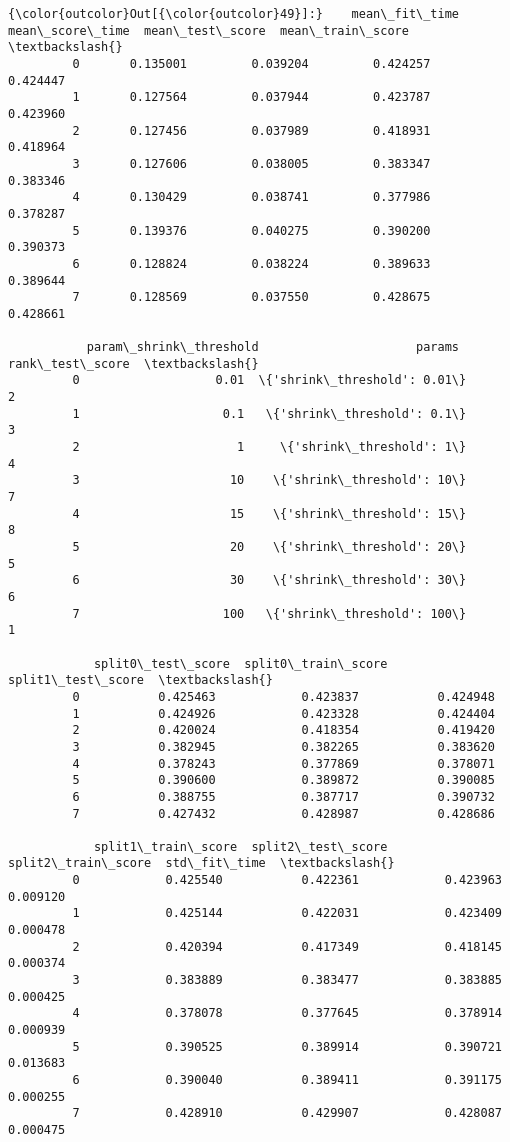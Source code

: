 \documentclass[11pt]{article}
\begin{document}
            \begin{Verbatim}[commandchars=\\\{\}]
{\color{outcolor}Out[{\color{outcolor}49}]:}    mean\_fit\_time  mean\_score\_time  mean\_test\_score  mean\_train\_score  \textbackslash{}
         0       0.135001         0.039204         0.424257          0.424447   
         1       0.127564         0.037944         0.423787          0.423960   
         2       0.127456         0.037989         0.418931          0.418964   
         3       0.127606         0.038005         0.383347          0.383346   
         4       0.130429         0.038741         0.377986          0.378287   
         5       0.139376         0.040275         0.390200          0.390373   
         6       0.128824         0.038224         0.389633          0.389644   
         7       0.128569         0.037550         0.428675          0.428661   
         
           param\_shrink\_threshold                      params  rank\_test\_score  \textbackslash{}
         0                   0.01  \{'shrink\_threshold': 0.01\}                2   
         1                    0.1   \{'shrink\_threshold': 0.1\}                3   
         2                      1     \{'shrink\_threshold': 1\}                4   
         3                     10    \{'shrink\_threshold': 10\}                7   
         4                     15    \{'shrink\_threshold': 15\}                8   
         5                     20    \{'shrink\_threshold': 20\}                5   
         6                     30    \{'shrink\_threshold': 30\}                6   
         7                    100   \{'shrink\_threshold': 100\}                1   
         
            split0\_test\_score  split0\_train\_score  split1\_test\_score  \textbackslash{}
         0           0.425463            0.423837           0.424948   
         1           0.424926            0.423328           0.424404   
         2           0.420024            0.418354           0.419420   
         3           0.382945            0.382265           0.383620   
         4           0.378243            0.377869           0.378071   
         5           0.390600            0.389872           0.390085   
         6           0.388755            0.387717           0.390732   
         7           0.427432            0.428987           0.428686   
         
            split1\_train\_score  split2\_test\_score  split2\_train\_score  std\_fit\_time  \textbackslash{}
         0            0.425540           0.422361            0.423963      0.009120   
         1            0.425144           0.422031            0.423409      0.000478   
         2            0.420394           0.417349            0.418145      0.000374   
         3            0.383889           0.383477            0.383885      0.000425   
         4            0.378078           0.377645            0.378914      0.000939   
         5            0.390525           0.389914            0.390721      0.013683   
         6            0.390040           0.389411            0.391175      0.000255   
         7            0.428910           0.429907            0.428087      0.000475   
         

\end{Verbatim}
\end{document}
